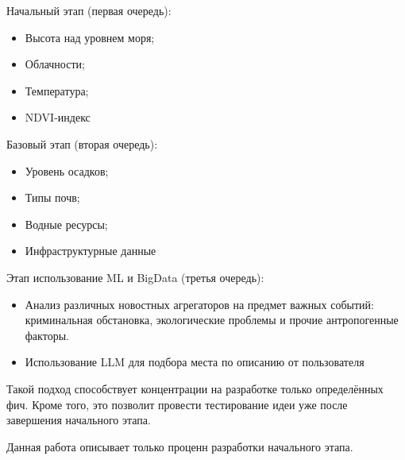 Начальный этап (первая очередь):
\begin{itemize}
	\item Высота над уровнем моря;
	\item Облачности;
	\item Температура;
	\item NDVI-индекс
\end{itemize}

Базовый этап (вторая очередь):
\begin{itemize}
	\item Уровень осадков;
	\item Типы почв;
	\item Водные ресурсы;
	\item Инфраструктурные данные
\end{itemize}

Этап использование ML и BigData (третья очередь):
\begin{itemize}
	\item Анализ различных новостных агрегаторов на предмет важных событий: криминальная обстановка, экологические проблемы и прочие антропогенные факторы.
	\item Использование LLM для подбора места по описанию от пользователя 
\end{itemize}

Такой подход способствует концентрации на разработке только определённых фич.
Кроме того, это позволит провести тестирование идеи уже после завершения начального этапа.

Данная работа описывает только проценн разработки начального этапа.